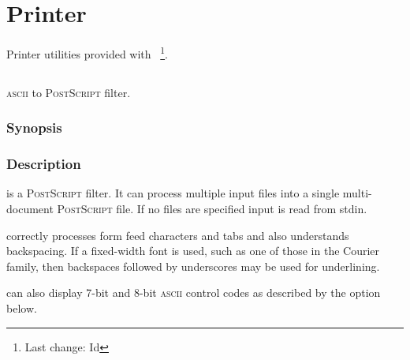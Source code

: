 \chapter{Printer}
\label{Printer}

Printer utilities provided with \aipspp\ \footnote{Last change:
$ $Id$ $}.


\section{}
\label{lwfa}



\textsc{ascii} to \textsc{PostScript} filter.

\subsection*{Synopsis}

\begin{synopsis}
\end{synopsis}

\subsection*{Description}

 is a \textsc{PostScript} filter.  It can process multiple input
files into a single multi-document \textsc{PostScript} file.  If no files are
specified input is read from stdin.

 correctly processes form feed characters and tabs and also
understands backspacing.  If a fixed-width font is used, such as one of those
in the Courier family, then backspaces followed by underscores may be used for
underlining.

 can also display 7-bit and 8-bit \textsc{ascii} control codes as
described by the  option below.

